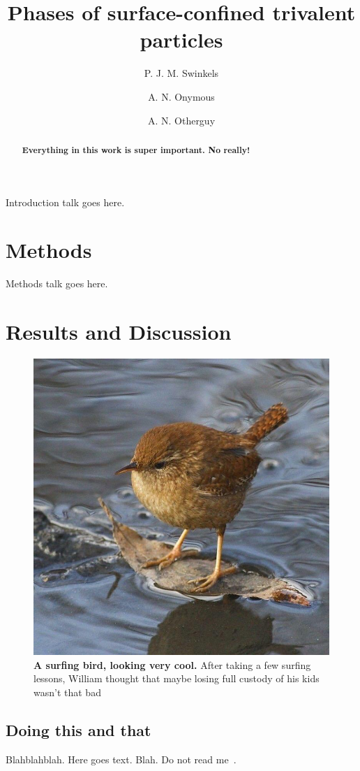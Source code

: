\documentclass{article}
\begin{document}
\title{Phases of surface-confined trivalent particles}

\author[1]{P. J. M. Swinkels}
\author[2]{A. N. Onymous}
\author[1]{A. N. Otherguy}
\date{}

\maketitle

\begin{abstract}
\textbf{
  Everything in this work is super important. No really!
}
\end{abstract}

Introduction talk goes here.

\section{Methods}

Methods talk goes here.

\section{Results and Discussion}
\begin{figure}
  \centering
  \includegraphics[width=0.5\linewidth]{figures/surfbird.jpg}
  \caption{
    \textbf{A surfing bird, looking very cool.} 
    After taking a few surfing lessons, William thought that maybe losing full custody of his kids wasn't that bad
  }
  \label{fig:1}
\end{figure}

\subsection{Doing this and that}
Blahblahblah. Here goes text. Blah. Do not read me~\cite{ExampleBook,ExampleArticle}.
\end{document}
